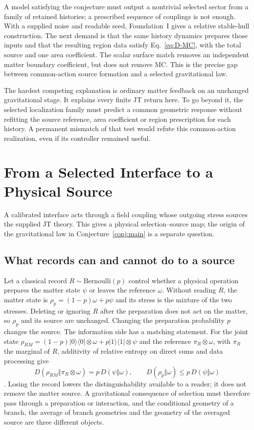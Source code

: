 A model satisfying the conjecture must output a nontrivial selected
sector from a family of retained histories; a prescribed sequence of
couplings is not enough. With a supplied noise and readable seed,
Foundation~I gives a relative stable-hull construction. The next demand
is that the same history dynamics prepares those inputs and that the
resulting region data satisfy Eq.~\eqref{eq:D-MC}, with the total source
and one area coefficient. The scalar surface match removes an
independent matter boundary coefficient, but does not remove MC.
This is the precise gap between common-action source formation and
a selected gravitational law.

The hardest competing explanation is ordinary matter feedback on an
unchanged gravitational stage. It explains every finite JT return here.
To go beyond it, the selected localization family must predict a
common geometric response without refitting the source reference,
area coefficient or region prescription for each history. A permanent
mismatch of that test would refute this common-action realization,
even if its controller remained useful.

\section{From a Selected Interface to a Physical Source}
\label{sec:source}

A calibrated interface acts through a field coupling whose outgoing stress
sources the supplied JT theory. This gives a physical selection--source map;
the origin of the gravitational law in Conjecture~\ref{conj:main} is a
separate question.

\subsection{What records can and cannot do to a source}
\label{sec:records}

Let a classical record $R\sim\mathrm{Bernoulli}(p)$ control whether a physical operation prepares the matter state $\psi$ or leaves the reference $\omega$. Without reading $R$, the matter state is $\rho_p=(1-p)\omega+p\psi$ and its stress is the mixture of the two stresses. Deleting or ignoring $R$ after the preparation does not act on the matter, so $\rho_p$ and its source are unchanged. Changing the preparation probability $p$ changes the source. The information side has a matching statement. For the joint state $\rho_{RM}=(1-p)|0\rangle\langle0|\otimes\omega+p|1\rangle\langle1|\otimes\psi$ and the reference $\pi_R\otimes\omega$, with $\pi_R$ the marginal of $R$, additivity of relative entropy on direct sums and data processing give
\begin{equation}
D(\rho_{RM}\Vert\pi_R\otimes\omega)=p\,D(\psi\Vert\omega),\qquad D(\rho_p\Vert\omega)\le p\,D(\psi\Vert\omega)
\end{equation}
\cite{OhyaPetz1993}. Losing the record lowers the distinguishability available to a reader; it does not remove the matter source. A gravitational consequence of selection must therefore pass through a preparation or interaction, and the conditional geometry of a branch, the average of branch geometries and the geometry of the averaged source are three different objects.

